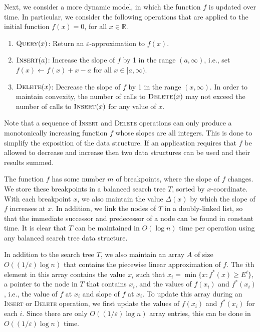 \documentclass[charterfonts,lotsofwhite]{patmorin}
\newcommand{\eps}{\varepsilon}
\newcommand{\Real}{\mathbb{R}}
\begin{document}
Next, we consider a more dynamic model, in which the function $f$ is
updated over time.  In particular, we consider the following
operations that are applied to the initial function $f(x)=0$, for all
$x\in\Real$.

\begin{enumerate}
\item $\textsc{Query}(x)$: Return an $\eps$-approximation to
  $f(x)$.

\item $\textsc{Insert}(a)$: Increase the slope of $f$ by 1 in the
  range $(a,\infty)$, i.e., set $f(x)\gets f(x)+x-a$ for all $x\in
  [a,\infty)$.

\item $\textsc{Delete}(x)$: Decrease the slope of $f$ by 1 in the
  range $(x,\infty)$.  In order to maintain convexity, the number of
  calls to $\textsc{Delete}(x)$ may not exceed the number of calls to
  $\textsc{Insert}(x)$ for any value of $x$.
\end{enumerate}

Note that a sequence of \textsc{Insert} and \textsc{Delete} operations
can only produce a monotonically increasing function $f$ whose slopes
are all integers.  This is done to simplify the exposition of the data
structure.  If an application requires that $f$ be allowed to decrease
and increase then two data structures can be used and their results
summed.  

The function $f$ has some number $m$ of breakpoints, where the slope
of $f$ changes.  We store these breakpoints in a balanced search tree
$T$, sorted by $x$-coordinate.  With each breakpoint $x$, we also
maintain the value $\Delta(x)$ by which the slope of $f$ increases at
$x$.  In addition, we link the nodes of $T$ in a doubly-linked list,
so that the immediate successor and predecessor of a node can be found
in constant time.  It is clear that $T$ can be maintained in $O(\log
n)$ time per operation using any balanced search tree data structure.

In addition to the search tree $T$, we also maintain an array $A$ of
size $O((1/\eps) \log n)$ that contains the piecewise linear
approximation of $f$.  The $i$th element in this array contains the
value $x_i$ such that $x_i=\min\{x:f^*(x) \ge E^i \}$, a pointer to
the node in $T$ that contains $x_i$, and the values of $f(x_i)$ and
$f^*(x_i)$, i.e., the value of $f$ at $x_i$ and slope of $f$ at $x_i$.
To update this array during an \textsc{Insert} or \textsc{Delete}
operation, we first update the values of $f(x_i)$ and $f^*(x_i)$ for
each $i$.  Since there are only $O((1/\eps) \log n)$ array entries,
this can be done in $O((1/\eps) \log n)$ time.
\end{document}
